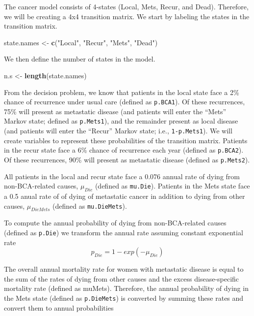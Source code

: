 \documentclass[]{article}
\newenvironment{Shaded}{\begin{snugshade}}{\end{snugshade}}
\newcommand{\KeywordTok}[1]{\textcolor[rgb]{0.13,0.29,0.53}{\textbf{#1}}}
\newcommand{\StringTok}[1]{\textcolor[rgb]{0.31,0.60,0.02}{#1}}
\newcommand{\NormalTok}[1]{#1}
\theoremstyle{definition}
\theoremstyle{definition}
\theoremstyle{definition}
\theoremstyle{remark}
\begin{document}
The cancer model consists of 4-states (Local, Mets, Recur, and Dead).
Therefore, we will be creating a 4x4 transition matrix. We start by
labeling the states in the transition matrix.

\begin{Shaded}
\begin{Highlighting}[]
\NormalTok{state.names <-}\StringTok{ }\KeywordTok{c}\NormalTok{(}\StringTok{"Local"}\NormalTok{, }\StringTok{"Recur"}\NormalTok{, }\StringTok{"Mets"}\NormalTok{, }\StringTok{"Dead"}\NormalTok{)}
\end{Highlighting}
\end{Shaded}

We then define the number of states in the model.

\begin{Shaded}
\begin{Highlighting}[]
\NormalTok{n.s <-}\StringTok{ }\KeywordTok{length}\NormalTok{(state.names)}
\end{Highlighting}
\end{Shaded}

From the decision problem, we know that patients in the local state face
a 2\% chance of recurrence under usual care (defined as
\texttt{p.BCA1}). Of these recurrences, 75\% will present as metastatic
disease (and patients will enter the ``Mets'' Markov state; defined as
\texttt{p.Mets1}), and the remainder present as local disease (and
patients will enter the ``Recur'' Markov state; i.e.,
\texttt{1-p.Mets1}). We will create variables to represent these
probabilities of the transition matrix. Patients in the recur state face
a 6\% chance of recurrence each year (defined as \texttt{p.BCA2}). Of
these recurrences, 90\% will present as metastatic disease (defined as
\texttt{p.Mets2}).

All patients in the local and recur state face a 0.076 annual rate of
dying from non-BCA-related causes, \(\mu_{Die}\) (defined as
\texttt{mu.Die}). Patients in the Mets state face a 0.5 anual rate of of
dying of metastatic cancer in addition to dying from other causes,
\(\mu_{DieMets}\) (defined as \texttt{mu.DieMets}).

To compute the annual probability of dying from non-BCA-related causes
(defined as \texttt{p.Die}) we transform the annual rate assuming
constant exponential rate \[
  p_{Die} = 1-exp(-\mu_{Die})
\]

The overall annual mortality rate for women with metastatic disease is
equal to the sum of the rates of dying from other causes and the excess
disease-specific mortality rate (defined as muMets). Therefore, the
annual probability of dying in the Mets state (defined as
\texttt{p.DieMets}) is converted by summing these rates and convert them
to annual probabilities
\end{document}

